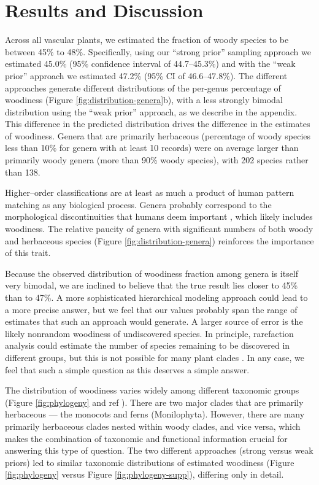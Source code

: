 \documentclass[12pt]{article}
\begin{document}
\section{Results and Discussion}

Across all vascular plants, we estimated the fraction of woody species
to be between 45\% to 48\%.
Specifically, using our ``strong prior'' sampling approach we
estimated 45.0\% (95\% confidence interval of 44.7--45.3\%) and with
the ``weak prior'' approach we estimated 47.2\% (95\% CI of
46.6--47.8\%).
% 
The different approaches generate different distributions of the
per-genus percentage of woodiness (Figure
\ref{fig:distribution-genera}b), with a less strongly bimodal
distribution using the ``weak prior'' approach, as we describe in the
appendix.
%
This difference in the predicted distribution drives the difference in
the estimates of woodiness.  Genera that are primarily herbaceous
(percentage of woody species less than 10\% for genera with at least
10 records) were on average larger than primarily woody genera (more
than 90\% woody species), with 202 species rather than 138.

Higher--order classifications are at least as much a product of human
pattern matching as any biological process.  Genera probably
correspond to the morphological discontinuities that humans deem
important \citep{scotland2004significance}, which likely includes
woodiness.  The relative paucity of genera with significant numbers of
both woody and herbaceous species (Figure
\ref{fig:distribution-genera}) reinforces the importance of this
trait.

Because the observed distribution of woodiness fraction among genera
is itself very bimodal, we are inclined to believe that the true
result lies closer to 45\% than to 47\%.  A more sophisticated
hierarchical modeling approach could lead to a more precise answer,
but we feel that our values probably span the range of estimates that
such an approach would generate.
%
A larger source of error is the likely nonrandom woodiness of
undiscovered species.  In principle, rarefaction analysis could
estimate the number of species remaining to be discovered in different
groups, but this is not possible for many plant clades
\citep{costello2011}.
%
In any case, we feel that such a simple question as this deserves a
simple answer.

The distribution of woodiness varies widely among different taxonomic
groups (Figure \ref{fig:phylogeny} and ref
\citep{sinnott1915evolution}).  There are two major clades that are
primarily herbaceous --- the monocots and ferns
(Monilophyta). However, there are many primarily herbaceous clades
nested within woody clades, and vice versa, which makes the
combination of taxonomic and functional information crucial for
answering this type of question.  The two different approaches (strong
versus weak priors) led to similar taxonomic distributions of
estimated woodiness (Figure \ref{fig:phylogeny} versus Figure
\ref{fig:phylogeny-supp}), differing only in detail.
\end{document}
